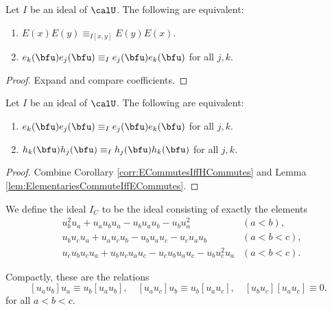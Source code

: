 \documentclass{article}
\begin{document}
\begin{lemma}
    \label{lem:ElementariesCommuteIffECommutes}
    Let $I$ be an ideal of $\calU$.
    The following are equivalent:
    \begin{enumerate}[label=(\alph*)]
        \item 
            $E(x)E(y) \equiv_{I[x,y]} E(y)E(x)$.
        \item 
            $e_k(\bfu)e_j(\bfu) \equiv_I e_j(\bfu)e_k(\bfu)$ for all $j,k$. 
    \end{enumerate}
\end{lemma}

\begin{proof}
    Expand and compare coefficients.
\end{proof}

\begin{lemma}
    Let $I$ be an ideal of $\calU$.
    The following are equivalent:
    \begin{enumerate}[label=(\alph*)]
        \item 
            $e_k(\bfu)e_j(\bfu) \equiv_I e_j(\bfu)e_k(\bfu)$ for all $j,k$. 
        \item 
            $h_k(\bfu)h_j(\bfu) \equiv_I h_j(\bfu)h_k(\bfu)$ for all $j,k$.
    \end{enumerate}
\end{lemma}

\begin{proof}
    Combine Corollary \ref{corr:ECommutesIffHCommutes} and Lemma \ref{lem:ElementariesCommuteIffECommutes}.
\end{proof}


\begin{definition}
    We define the ideal $I_C$ to be the ideal consisting of exactly the elements
    \begin{align}
        &
        u_b^2u_a + u_au_bu_a - u_bu_au_b - u_bu_a^2 
        &
        (a<b),
        \\
        &
        u_bu_cu_a + u_au_cu_b - u_bu_au_c - u_cu_au_b
        &
        (a<b<c),
        \\
        &
        u_cu_bu_cu_a + u_bu_cu_au_c - u_cu_bu_au_c - u_bu_c^2u_a
        &
        (a<b<c).
    \end{align}
\end{definition}

Compactly, these are the relations
\[
    [u_au_b]u_a \equiv u_b[u_au_b], \quad
    [u_au_c]u_b \equiv u_b[u_au_c], \quad
    [u_bu_c][u_au_c] \equiv 0.
\]
for all $a<b<c$.
\end{document}
